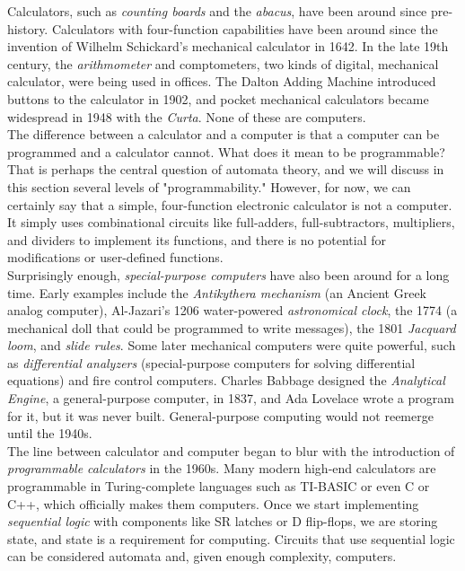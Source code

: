 Calculators, such as \textit{counting boards} and the \textit{abacus}, have been around since pre-history. Calculators with four-function capabilities have been around since the invention of Wilhelm Schickard's mechanical calculator in 1642. In the late 19th century, the \textit{arithmometer} and comptometers, two kinds of digital, mechanical calculator, were being used in offices. The Dalton Adding Machine introduced buttons to the calculator in 1902, and pocket mechanical calculators became widespread in 1948 with the \textit{Curta}. None of these are computers. \\

The difference between a calculator and a computer is that a computer can be programmed and a calculator cannot. What does it mean to be programmable? That is perhaps the central question of automata theory, and we will discuss in this section several levels of "programmability." However, for now, we can certainly say that a simple, four-function electronic calculator is not a computer. It simply uses combinational circuits like full-adders, full-subtractors, multipliers, and dividers to implement its functions, and there is no potential for modifications or user-defined functions. \\

Surprisingly enough, \textit{special-purpose computers} have also been around for a long time. Early examples include the \textit{Antikythera mechanism} (an Ancient Greek analog computer), Al-Jazari's 1206 water-powered \textit{astronomical clock}, the 1774  (a mechanical doll that could be programmed to write messages), the 1801 \textit{Jacquard loom}, and \textit{slide rules}. Some later mechanical computers were quite powerful, such as \textit{differential analyzers} (special-purpose computers for solving differential equations) and fire control computers. Charles Babbage designed the \textit{Analytical Engine}, a general-purpose computer, in 1837, and Ada Lovelace wrote a program for it, but it was never built. General-purpose computing would not reemerge until the 1940s. \\

The line between calculator and computer began to blur with the introduction of \textit{programmable calculators} in the 1960s. Many modern high-end calculators are programmable in Turing-complete languages such as TI-BASIC or even C or C++, which officially makes them computers. Once we start implementing \textit{sequential logic} with components like SR latches or D flip-flops, we are storing state, and state is a requirement for computing. Circuits that use sequential logic can be considered automata and, given enough complexity, computers. \\

